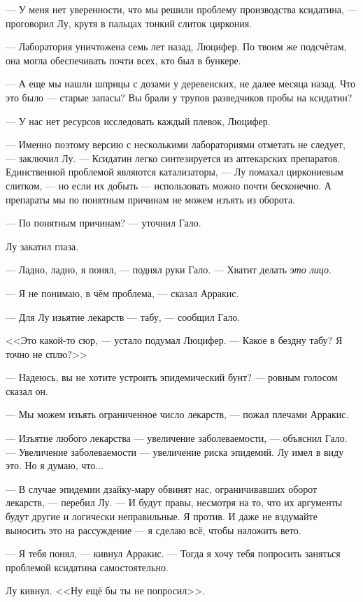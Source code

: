 --- У меня нет уверенности, что мы решили проблему производства ксидатина, --- проговорил Лу, крутя в пальцах тонкий слиток циркония.

--- Лаборатория уничтожена семь лет назад, Люцифер.
По твоим же подсчётам, она могла обеспечивать почти всех, кто был в бункере.

--- А еще мы нашли шприцы с дозами у деревенских, не далее месяца назад.
Что это было --- старые запасы?
Вы брали у трупов разведчиков пробы на ксидатин?

--- У нас нет ресурсов исследовать каждый плевок, Люцифер.

--- Именно поэтому версию с несколькими лабораториями отметать не следует, --- заключил Лу.
--- Ксидатин легко синтезируется из аптекарских препаратов.
Единственной проблемой являются катализаторы, --- Лу помахал циркониевым слитком, --- но если их добыть --- использовать можно почти бесконечно.
А препараты мы по понятным причинам не можем изъять из оборота.

--- По понятным причинам? --- уточнил Гало.

Лу закатил глаза.

--- Ладно, ладно, я понял, --- поднял руки Гало.
--- Хватит делать \emph{это лицо}.

--- Я не понимаю, в чём проблема, --- сказал Арракис.

--- Для Лу изьятие лекарств --- табу, --- сообщил Гало.

<<Это какой-то сюр, --- устало подумал Люцифер.
--- Какое в бездну табу?
Я точно не сплю?>>

--- Надеюсь, вы не хотите устроить эпидемический бунт? --- ровным голосом сказал он.

--- Мы можем изъять ограниченное число лекарств, --- пожал плечами Арракис.

--- Изъятие любого лекарства --- увеличение заболеваемости, --- объяснил Гало.
--- Увеличение заболеваемости --- увеличение риска эпидемий.
Лу имел в виду это.
Но я думаю, что...

--- В случае эпидемии дзайку-мару обвинят нас, ограничивавших оборот лекарств, --- перебил Лу.
--- И будут правы, несмотря на то, что их аргументы будут другие и логически неправильные.
Я против.
И даже не вздумайте выносить это на рассуждение --- я сделаю всё, чтобы наложить вето.

--- Я тебя понял, --- кивнул Арракис.
--- Тогда я хочу тебя попросить заняться проблемой ксидатина самостоятельно.

Лу кивнул.
<<Ну ещё бы ты не попросил>>.

